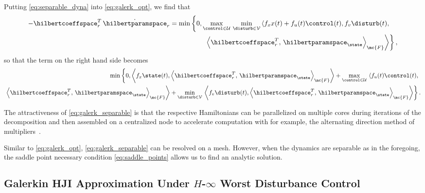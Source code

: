 Putting \eqref{eq:separable_dyna} into \eqref{eq:galerk_opt}, we find that
%
\begin{align}
	\begin{split}
		-\hilbertcoeffspace_r^T \, \dot{\hilbertparamspace}_r  &= \min \left\{0, \max_{\control \in \mathcal{U}} \, \min_{\disturb \in \mathcal{V}} \left\langle f_x x(t) + f_u (t) \control(t), f_v \disturb(t), \right. \right. \\
		& \qquad \qquad \quad \left. \left. \left\langle \hilbertcoeffspace_r^T, \, \hilbertparamspace_{\state}\right\rangle_{\mc{F}} \right\rangle \right\},
	\end{split}
\end{align}
%
so that the term on the right hand side becomes
%
\begin{align}
	\begin{split}
		\min \left\{0,\left\langle f_x \state(t),  \left\langle \hilbertcoeffspace_r^T, \, \hilbertparamspace_{\state}\right\rangle_{\mc{F}} \right\rangle
		+ \max_{\control \in \mathcal{U}} \, \left\langle f_u (t) \control(t), \right. \right. \\ 
		\left. \left. \left\langle \hilbertcoeffspace_r^T, \, \hilbertparamspace_{\state}\right\rangle_{\mc{F}} \right\rangle 
		+ \min_{\disturb \in \mathcal{V}}\, \left\langle   f_v \disturb(t), \left\langle \hilbertcoeffspace_r^T, \, \hilbertparamspace_{\state}\right\rangle_{\mc{F}} \right\rangle \right\}.
	\end{split}
	  \label{eq:galerk_separable}
\end{align}

The attractiveness of \eqref{eq:galerk_separable} is that the respective Hamiltonians can be parallelized on multiple cores during iterations of the decomposition and then assembled on a centralized node to accelerate computation with for example, the alternating direction method of multipliers~\cite{BoydADMM}.  

Similar to \eqref{eq:galerk_opt}, \eqref{eq:galerk_separable} can be resolved on a mesh. However, when the dynamics are separable as in the foregoing, the saddle point necessary condition \ie \eqref{eq:saddle_points} allows us to find an analytic solution. 
%

\subsection{Galerkin HJI Approximation Under $H$-$\infty$ Worst Disturbance Control}
\label{sec:hinfty}

